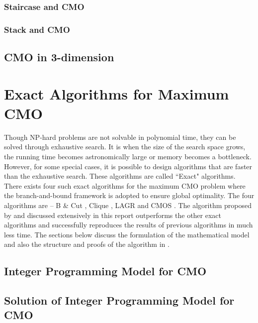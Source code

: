 \subsection{Staircase and CMO}


\subsection{Stack and CMO}


\section {CMO in 3-dimension}


\chapter{Exact Algorithms for Maximum CMO}
\label{exact}
Though NP-hard problems are not solvable in polynomial time, they can be solved through exhaustive search. It is when the size of the search space grows, the running time becomes astronomically large or memory becomes a bottleneck. However, for some special cases, it is possible to design algorithms that are faster than the exhaustive search. These algorithms are called ``Exact" algorithms. There exists four such exact algorithms for the maximum CMO problem where the branch-and-bound framework is adopted to ensure global optimality. The four algorithms are -- B \& Cut \citep{carr00}, Clique \citep{strick05}, LAGR \citep{cap04} and CMOS \citep{xie07}. The algorithm proposed by \citet{anmy11} and discussed extensively in this report outperforms the other exact algorithms and successfully reproduces the results of previous algorithms in much less time. The sections below discuss the formulation of the mathematical model and also the structure and proofs of the algorithm in \citet{anmy11}.

\section {Integer Programming Model for CMO}

\section {Solution of Integer Programming Model for CMO}



